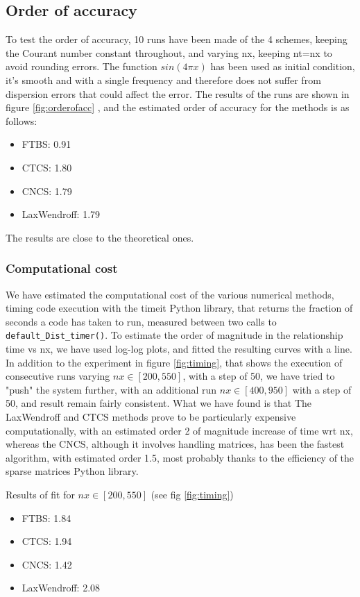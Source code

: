 \subsection{Order of accuracy}
To test the order of accuracy, 10 runs have been made of the 4 schemes, keeping the Courant number constant throughout, and varying nx, keeping nt=nx to avoid rounding errors. The function $sin(4\pi x)$ has been used as initial condition, it's smooth and with a single frequency and therefore does not suffer from dispersion errors that could affect the error.
The results of the runs are shown in figure \ref{fig:orderofacc} , and the estimated order of accuracy for the methods is as follows:
\begin{itemize}
\item FTBS: 0.91
\item CTCS: 1.80
\item CNCS: 1.79
\item LaxWendroff: 1.79
\end{itemize}
The results are close to the theoretical ones.

\subsubsection{Computational cost}
\label{sec:compcost}
We have estimated the computational cost of the various numerical methods, timing code execution with the timeit Python library, that returns the fraction of seconds a code has taken to run, measured between two calls to \texttt{default\_Dist\_timer()}.
To estimate the order of magnitude in the relationship time vs nx, we have used log-log plots, and fitted the resulting curves with a line. In addition to the experiment in figure \ref{fig:timing}, that shows the execution of consecutive runs varying $nx\in [200, 550]$, with a step of 50, we have tried to "push" the system further, with an additional run $nx\in [400, 950]$ with a step of 50, and result remain fairly consistent.
What we have found is that The LaxWendroff and CTCS methods prove to be particularly expensive computationally, with an estimated order 2 of magnitude increase of time wrt nx, whereas the CNCS, although it involves handling matrices, has been the fastest algorithm, with estimated order 1.5, most probably thanks to the efficiency of the sparse matrices Python library.

Results of fit for $nx\in [200, 550]$ (see fig \ref{fig:timing})
\begin{itemize}
	\item FTBS: 1.84
	\item CTCS: 1.94
	\item CNCS: 1.42
	\item LaxWendroff: 2.08
\end{itemize}

